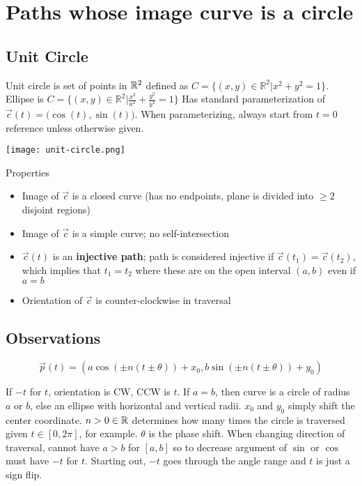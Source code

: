 \section{Paths whose image curve is a circle}

\subsection{Unit Circle}

Unit circle is set of points in $\mathbb{R}^2$ defined as $C=\{(x,y)\in\mathbb{R} ^2|x^2+y^2=1\}$. Ellipse is
$C=\{(x,y)\in\mathbb{R} ^2|\frac{x^2}{a^2}+\frac{y^2}{b^2}=1\}$
Has standard parameterization of $\vec{c}(t)=\big(\cos(t),\sin(t)\big)$.
When parameterizing, always start from $t=0$ reference unless otherwise given.\newline 

\begin{center}
    \texttt{[image: unit-circle.png]}
\end{center}

\noindent Properties
\begin{itemize}
    \item Image of $\vec{c}$ is a closed curve (has no endpoints, plane is divided into $\geq 2$ disjoint regions)
    \item Image of $\vec{c}$ is a simple curve; no self-intersection 
    \item $\vec{c}(t)$ is an \textbf{injective path}; path is considered injective if $\vec{c}(t_1)=\vec{c}(t_2)$, which implies that $t_1=t_2$ where 
    these are on the open interval $(a,b)$ even if $a=b$
    \item Orientation of $\vec{c}$ is counter-clockwise in traversal
\end{itemize}

\subsection{Observations}

\[\boxed{\vec{p}(t)=(a\cos (\pm n(t \pm\theta)) + x_0, b\sin (\pm n(t \pm \theta)) + y_0)}\]

If $-t$ for $t$, orientation is CW, CCW is $t$. If $a=b$, then curve is 
a circle of radius $a$ or $b$, else an ellipse with horizontal and vertical radii.
$x_0$ and $y_0$ simply shift the center coordinate. $n>0\in \mathbb{R}$ determines how many times
the circle is traversed given $t\in[0,2\pi]$, for example. $\theta$ is the phase shift.
When changing direction of traversal, cannot have $a>b$ for $[a,b]$ so to decrease argument of $\sin$ or $\cos$
must have $-t$ for $t$. Starting out, $-t$ goes through the angle range and $t$ is just a sign flip.

